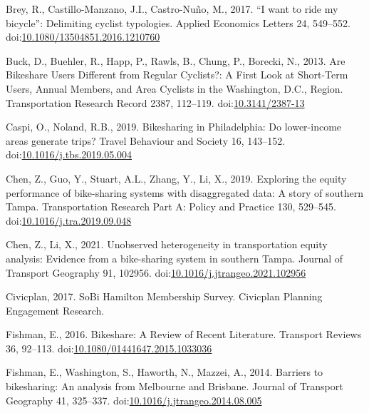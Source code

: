 \documentclass[]{elsarticle} %
\begin{document}
\leavevmode\hypertarget{ref-breyWantRideMy2017}{}%
Brey, R., Castillo-Manzano, J.I., Castro-Nuño, M., 2017. ``I want to
ride my bicycle'': Delimiting cyclist typologies. Applied Economics
Letters 24, 549--552.
doi:\href{https://doi.org/10.1080/13504851.2016.1210760}{10.1080/13504851.2016.1210760}

\leavevmode\hypertarget{ref-buckAreBikeshareUsers2013}{}%
Buck, D., Buehler, R., Happ, P., Rawls, B., Chung, P., Borecki, N.,
2013. Are Bikeshare Users Different from Regular Cyclists?: A First Look
at Short-Term Users, Annual Members, and Area Cyclists in the
Washington, D.C., Region. Transportation Research Record 2387, 112--119.
doi:\href{https://doi.org/10.3141/2387-13}{10.3141/2387-13}

\leavevmode\hypertarget{ref-caspiBikesharingPhiladelphiaLowerincome2019}{}%
Caspi, O., Noland, R.B., 2019. Bikesharing in Philadelphia: Do
lower-income areas generate trips? Travel Behaviour and Society 16,
143--152.
doi:\href{https://doi.org/10.1016/j.tbs.2019.05.004}{10.1016/j.tbs.2019.05.004}

\leavevmode\hypertarget{ref-chenExploringEquityPerformance2019}{}%
Chen, Z., Guo, Y., Stuart, A.L., Zhang, Y., Li, X., 2019. Exploring the
equity performance of bike-sharing systems with disaggregated data: A
story of southern Tampa. Transportation Research Part A: Policy and
Practice 130, 529--545.
doi:\href{https://doi.org/10.1016/j.tra.2019.09.048}{10.1016/j.tra.2019.09.048}

\leavevmode\hypertarget{ref-chenUnobservedHeterogeneityTransportation2021}{}%
Chen, Z., Li, X., 2021. Unobserved heterogeneity in transportation
equity analysis: Evidence from a bike-sharing system in southern Tampa.
Journal of Transport Geography 91, 102956.
doi:\href{https://doi.org/10.1016/j.jtrangeo.2021.102956}{10.1016/j.jtrangeo.2021.102956}

\leavevmode\hypertarget{ref-civicplanSoBiHamiltonMembership2017}{}%
Civicplan, 2017. SoBi Hamilton Membership Survey. Civicplan \textbar{}
Planning Engagement Research.

\leavevmode\hypertarget{ref-fishmanBikeshareReviewRecent2016}{}%
Fishman, E., 2016. Bikeshare: A Review of Recent Literature. Transport
Reviews 36, 92--113.
doi:\href{https://doi.org/10.1080/01441647.2015.1033036}{10.1080/01441647.2015.1033036}

\leavevmode\hypertarget{ref-fishmanBarriersBikesharingAnalysis2014}{}%
Fishman, E., Washington, S., Haworth, N., Mazzei, A., 2014. Barriers to
bikesharing: An analysis from Melbourne and Brisbane. Journal of
Transport Geography 41, 325--337.
doi:\href{https://doi.org/10.1016/j.jtrangeo.2014.08.005}{10.1016/j.jtrangeo.2014.08.005}
\end{document}
